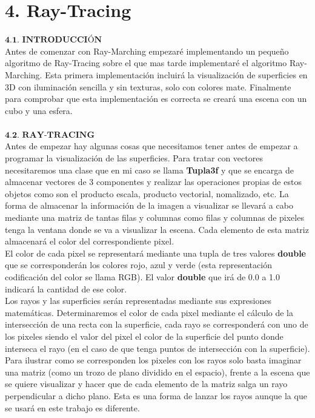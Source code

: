 \chapter*{4. Ray-Tracing}

$\textbf{4.1. INTRODUCCIÓN}$
${ }$\\

Antes de comenzar con Ray-Marching empezaré implementando un pequeño algoritmo de Ray-Tracing sobre el que mas tarde implementaré el algoritmo Ray-Marching. Esta primera implementación incluirá la visualización de superficies en 3D con iluminación sencilla y sin texturas, solo con colores mate. Finalmente para comprobar que esta implementación es correcta se creará una escena con un cubo y una esfera.
${ }$\\

${ }$\\
$\textbf{4.2. RAY-TRACING}$
${ }$\\

Antes de empezar hay algunas cosas que necesitamos tener antes de empezar a programar la visualización de las superficies. Para tratar con vectores necesitaremos una clase que en mi caso se llama \textbf{Tupla3f} y que se encarga de almacenar vectores de 3 componentes y realizar las operaciones propias de estos objetos como son el producto escala, producto vectorial, nomalizado, etc. La forma de almacenar la información de la imagen a visualizar se llevará a cabo mediante una matriz de tantas filas y columnas como filas y columnas de pixeles tenga la ventana donde se va a visualizar la escena. Cada elemento de esta matriz almacenará el color del correspondiente pixel.
	${ }$\\	
	
El color de cada pixel se representará mediante una tupla de tres valores \textbf{double} que se corresponderán los colores rojo, azul y verde (esta representación codificación del color se llama RGB). El valor \textbf{double} que irá de 0.0 a 1.0 indicará la cantidad de ese color.
	${ }$\\	
	
Los rayos y las superficies serán representadas mediante sus expresiones matemáticas. Determinaremos el color de cada pixel mediante el cálculo de la intersección de una recta con la superficie, cada rayo se corresponderá con uno de los pixeles siendo el valor del pixel el color de la superficie del punto donde interseca el rayo (en el caso de que tenga puntos de intersección con la superficie). Para ilustrar como se corresponden los pixeles con los rayos solo basta imaginar una matriz (como un trozo de plano dividido en el espacio), frente a la escena que se quiere visualizar y hacer que de cada elemento de la matriz salga un rayo perpendicular a dicho plano. Esta es una forma de lanzar los rayos aunque la que se usará en este trabajo es diferente.
	${ }$\\	
	
